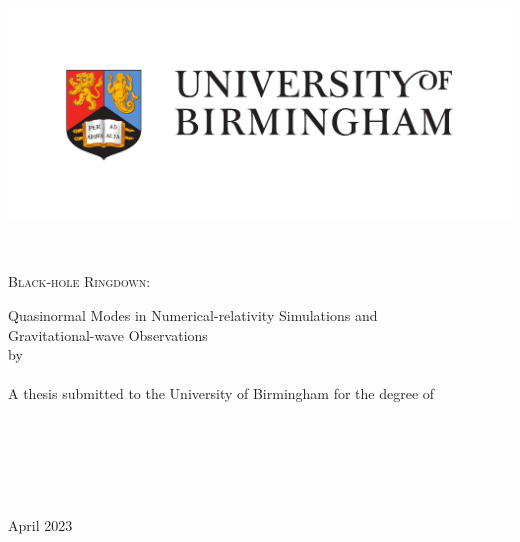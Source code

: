\documentclass[
12pt, %
english, %
doublespacing, %
headsepline, %
]{MastersDoctoralThesis} %
\author{Eliot Finch} %
\begin{document}
\frontmatter %

\pagestyle{plain} %

\begin{singlespacing}


\begin{titlepage}
\begin{center}

\includegraphics[width=0.8\columnwidth]{Figures/full-colour-logo.pdf}

\HRule \\[0.2cm] %
{\scshape\huge Black-hole Ringdown:\par}\vspace{0.4cm} %
Quasinormal Modes in Numerical-relativity Simulations and \\
Gravitational-wave Observations\vspace{0.1cm}
\HRule \\[1.cm] %

by\\[0.9cm]
{\scshape \large \authorname}\\[2.cm]

A thesis submitted to the University of Birmingham for the degree of \\[0.1cm]
{\textsc \degreename}\\[2cm]

\vfill

\begin{flushright} \normalsize
\groupname\\
\deptname\\
\facname\\
\univname\\[0.7cm]
April 2023


\end{flushright}
\end{center}
\end{titlepage}
\end{singlespacing}
\end{document}
